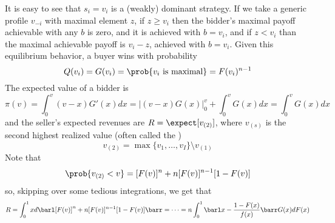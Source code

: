\documentclass[10pt]{article}
\begin{document}
\begin{example}
	 It is easy to see that $s_i = v_i$ is a (weakly) dominant strategy. If we take a generic profile $v_{-i}$ with maximal element $z$, if $z \ge v_i$ then the bidder's maximal payoff achievable with any $b$ is zero, and it is achieved with $b = v_i$, and if $z < v_i$ than the maximal achievable payoff is $v_i - z$, achieved with $b = v_i$. Given this equilibrium behavior, a buyer wins with probability \[Q(v_i) = G(v_i) = \prob\{v_i \text{ is maximal}\} = F(v_i)^{n-1}\]The expected value of a bidder is \[\pi(v) = \int_0^v (v-x)G'(x)dx = \Big| (v-x)G(x)\Big|_0^v + \int_0^v G(x)dx = \int_0^v G(x)dx \]and the seller's expected revenues are $R = \expect[v_{(2)}]$, where $v_{(s)}$ is the second highest realized value (often called the ) \[v_{(2)} = \max\{v_1,\dots,v_I\} \setminus v_{(1)}\]Note that \[\prob\{v_{(2)} < v\} = [F(v)]^n + n [F(v)]^{n-1}[1-F(v)]\]so, skipping over some tedious integrations, we get that\[R = \int_0^1 x d\barl [F(v)]^n + n [F(v)]^{n-1}[1-F(v)]\barr = \cdots =  n\int_0^1 \barl x - \frac{1-F(x)}{f(x)}\barr G(x)dF(x)\]
\end{example}
\end{document}
